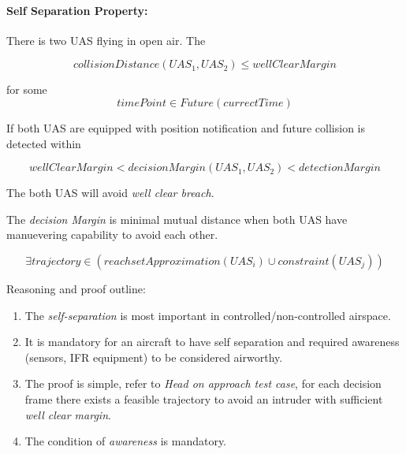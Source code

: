 \setcounter{chapter}{8}
\setcounter{section}{3}
\setcounter{subsection}{0}
\paragraph{Self Separation Property:} There is two UAS flying in open air. The 

\begin{equation*}
    collision Distance (UAS_1,UAS_2) \le well Clear Margin
\end{equation*} 

for some 
\begin{equation*}
    time Point \in Future(currect Time)    
\end{equation*}


If both UAS are equipped with position notification and future collision is detected within 

\begin{equation*}
    well Clear Margin < decision Margin(UAS_1,UAS_2) < detection Margin    
\end{equation*}

The both UAS will avoid \emph{well clear breach}.
\begin{note}
    The \emph{decision Margin} is minimal mutual distance when both UAS have manuevering capability to avoid each other.
    
    \begin{equation*}
        \exists trajectory \in \left(reach set Approximation(UAS_i) \cup constraint(UAS_j) \right)
    \end{equation*}
\end{note}

\noindent Reasoning and proof outline:
\begin{enumerate}
    \item The \emph{self-separation} is most important in controlled/non-controlled airspace.
    
    \item It is mandatory for an aircraft to have self separation and required awareness (sensors, IFR equipment) to be considered airworthy.
    
    \item The proof is simple, refer to \emph{Head on approach test case}, for each decision frame there exists a feasible trajectory to avoid an intruder with sufficient \emph{well clear margin}.
    
    \item The condition of \emph{awareness} is mandatory.
\end{enumerate}

